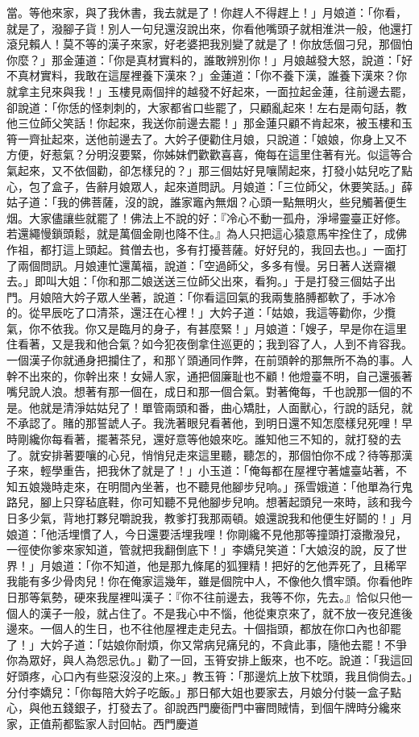 \begin{showcontents}{}
當。等他來家，與了我休書，我去就是了！你趕人不得趕上！」月娘道：「你看，就是了，潑腳子貨！別人一句兒還沒說出來，你看他嘴頭子就相淮洪一般，他還打滾兒賴人！莫不等的漢子來家，好老婆把我別變了就是了！你放恁個刁兒，那個怕你麼？」那金蓮道：「你是真材實料的，誰敢辨別你！」月娘越發大怒，說道：「好不真材實料，我敢在這屋裡養下漢來？」金蓮道：「你不養下漢，誰養下漢來？你就拿主兒來與我！」玉樓見兩個拌的越發不好起來，一面拉起金蓮，往前邊去罷，卻說道：「你恁的怪刺刺的，大家都省口些罷了，只顧亂起來！左右是兩句話，教他三位師父笑話！你起來，我送你前邊去罷！」那金蓮只顧不肯起來，被玉樓和玉筲一齊扯起來，送他前邊去了。大妗子便勸住月娘，只說道：「娘娘，你身上又不方便，好惹氣？分明沒要緊，你姊妹們歡歡喜喜，俺每在這里住著有光。似這等合氣起來，又不依個勸，卻怎樣兒的？」那三個姑好見嚷鬧起來，打發小姑兒吃了點心，包了盒子，告辭月娘眾人，起來道問訊。月娘道：「三位師父，休要笑話。」薛姑子道：「我的佛菩薩，沒的說，誰家竈內無烟？心頭一點無明火，些兒觸著便生烟。大家儘讓些就罷了！佛法上不說的好：『冷心不動一孤舟，淨埽靈臺正好修。若還繩慢鎖頭鬆，就是萬個金剛也降不住。』為人只把這心猿意馬牢拴住了，成佛作祖，都打這上頭起。貧僧去也，多有打擾菩薩。好好兒的，我回去也。」一面打了兩個問訊。月娘連忙還萬福，說道：「空過師父，多多有慢。另日著人送齋襯去。」即叫大姐：「你和那二娘送送三位師父出來，看狗。」于是打發三個姑子出門。月娘陪大妗子眾人坐著，說道：「你看這回氣的我兩隻胳膊都軟了，手冰冷的。從早辰吃了口清茶，還汪在心裡！」大妗子道：「姑娘，我這等勸你，少攬氣，你不依我。你又是臨月的身子，有甚麼緊！」月娘道：「嫂子，早是你在這里住看著，又是我和他合氣？如今犯夜倒拿住巡更的；我到容了人，人到不肯容我。一個漢子你就通身把攔住了，和那丫頭通同作弊，在前頭幹的那無所不為的事。人幹不出來的，你幹出來！女婦人家，通把個廉耻也不顧！他燈臺不明，自己還張著嘴兒說人浪。想著有那一個在，成日和那一個合氣。對著俺每，千也說那一個的不是。他就是清淨姑姑兒了！單管兩頭和番，曲心矯肚，人面獸心，行說的話兒，就不承認了。賭的那誓諕人子。我洗著眼兒看著他，到明日還不知怎麼樣兒死哩！早時剛纔你每看著，擺著茶兒，還好意等他娘來吃。誰知他三不知的，就打發的去了。就安排著要嚷的心兒，悄悄兒走來這里聽，聽怎的，那個怕你不成？待等那漢子來，輕學重告，把我休了就是了！」小玉道：「俺每都在屋裡守著爐臺站著，不知五娘幾時走來，在明間內坐著，也不聽見他腳步兒响。」孫雪娥道：「他單為行鬼路兒，腳上只穿毡底鞋，你可知聽不見他腳步兒响。想著起頭兒一來時，該和我今日多少氣，背地打夥兒嚼說我，教爹打我那兩頓。娘還說我和他便生好鬬的！」月娘道：「他活埋慣了人，今日還要活埋我哩！你剛纔不見他那等撞頭打滾撒潑兒，一徑使你爹來家知道，管就把我翻倒底下！」李嬌兒笑道：「大娘沒的說，反了世界！」月娘道：「你不知道，他是那九條尾的狐狸精！把好的乞他弄死了，且稀罕我能有多少骨肉兒！你在俺家這幾年，雖是個院中人，不像他久慣牢頭。你看他昨日那等氣勢，硬來我屋裡叫漢子：『你不往前邊去，我等不你，先去。』恰似只他一個人的漢子一般，就占住了。不是我心中不惱，他從東京來了，就不放一夜兒進後邊來。一個人的生日，也不往他屋裡走走兒去。十個指頭，都放在你口內也卻罷了！」大妗子道：「姑娘你耐煩，你又常病兒痛兒的，不貪此事，隨他去罷！不爭你為眾好，與人為怨忌仇。」勸了一回，玉筲安排上飯來，也不吃。說道：「我這回好頭疼，心口內有些惡沒沒的上來。」教玉筲：「那邊炕上放下枕頭，我且倘倘去。」分付李嬌兒：「你每陪大妗子吃飯。」那日郁大姐也要家去，月娘分付裝一盒子點心，與他五錢銀子，打發去了。卻說西門慶衙門中審問賊情，到個午牌時分纔來家，正值荊都監家人討回帖。西門慶道
\end{showcontents}
